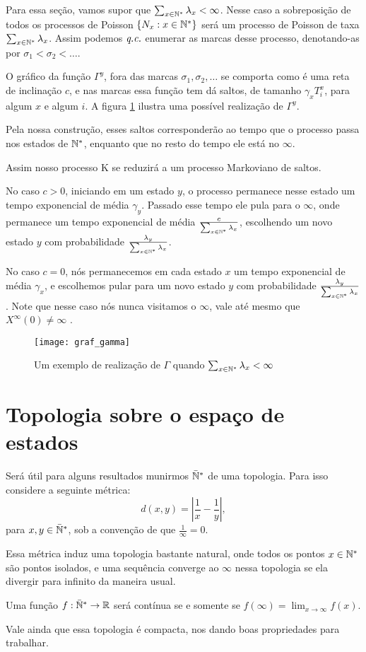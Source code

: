 Para essa seção, vamos supor que $\sum_{x \in {\mathbb{N^*}}} \lambda_x <
\infty$. Nesse caso a sobreposição de todos os processos de Poisson
$\{N_x : x \in {\mathbb{N^*}}\}$ será um processo de Poisson de taxa $\sum_{x \in
  {\mathbb{N^*}}} \lambda_x$. Assim podemos ${\emph{q.c.}}$ enumerar as marcas desse
processo, denotando-as por $ \sigma_1 < \sigma_2 < \ldots$.

O gráfico da função $\Gamma^y$, fora das marcas $\sigma_1, \sigma_2,
\ldots$ se comporta como é uma reta de inclinação $c$, e nas marcas
essa função tem dá saltos, de tamanho $\gamma_x T^x_i$, para algum $x$
e algum $i$. A figura \ref{fig:graf_gamma} ilustra uma possível
realização de $\Gamma^y$.


Pela nossa construção, esses saltos corresponderão ao tempo que o
processo passa nos estados de ${\mathbb{N^*}}$, enquanto que no resto do tempo
ele está no $\infty$.

Assim nosso processo K se reduzirá a um processo Markoviano de
saltos.

No caso $c > 0$, iniciando em um estado $y$, o processo permanece
nesse estado um tempo exponencial de média $\gamma_y$. Passado esse
tempo ele pula para o $\infty$, onde permanece um tempo exponencial de
média $\frac{c}{\sum_{x \in {\mathbb{N^*}}} \lambda_x}$, escolhendo um novo
estado $y$ com probabilidade $\frac{\lambda_y}{\sum_{x \in {\mathbb{N^*}}}
  \lambda_x}$.

No caso $c=0$, nós permanecemos em cada estado $x$ um tempo
exponencial de média $\gamma_x$, e escolhemos pular para um novo estado $y$
com probabilidade $\frac{\lambda_y}{\sum_{x \in {\mathbb{N^*}}} \lambda_x}$.
Note que nesse caso nós nunca visitamos o $\infty$, vale até mesmo que
$X^\infty(0) \neq \infty$ \qc.


\begin{figure}
  \centering
  \texttt{[image: graf\_gamma]}
  \caption{Um exemplo de realização de $\Gamma$ quando $\sum_{x \in
      {\mathbb{N^*}}} \lambda_x < \infty$}
  \label{fig:graf_gamma}
\end{figure}

\section{Topologia sobre o espaço de estados}
\label{sec:topologia}

Será útil para alguns resultados munirmos ${\mathbb{\bar{N}^*}}$ de uma
topologia. Para isso considere a seguinte métrica:
\begin{equation}
  \label{eq:metrica}
  d(x, y) = \left\lvert \frac{1}{x} - \frac{1}{y} \right\rvert,
\end{equation}
para $x, y \in {\mathbb{\bar{N}^*}}$, sob a convenção de que $\frac{1}{\infty} = 0$.

Essa métrica induz uma topologia bastante natural, onde todos os
pontos $x \in {\mathbb{N^*}}$ são pontos isolados, e uma sequência converge ao
$\infty$ nessa topologia se ela divergir para infinito da maneira
usual.

Uma função $f: {\mathbb{\bar{N}^*}} \to {\mathbb{R}}$ será contínua se e somente se
$f(\infty) = \lim_{x \to \infty} f(x)$.

Vale ainda que essa topologia é compacta, nos dando boas propriedades
para trabalhar.

